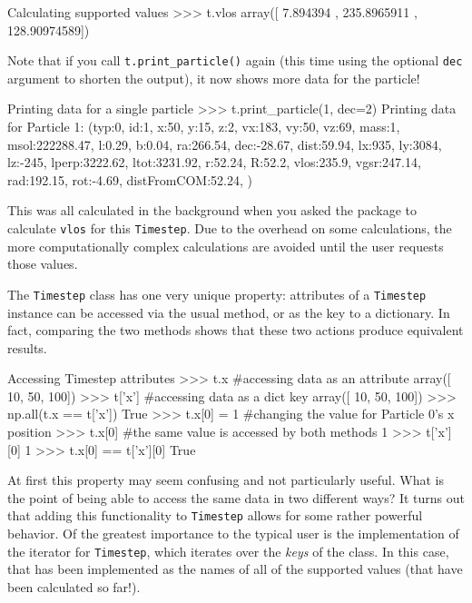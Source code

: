 \documentclass{article}
\begin{document}
\begin{codelisting}{Calculating supported values}
>>> t.vlos
array([  7.894394  , 235.8965911 , 128.90974589])
\end{codelisting}

Note that if you call \verb!t.print_particle()! again (this time using the optional \verb!dec! argument to shorten the output), it now shows more data for the particle! \\

\begin{codelisting}{Printing data for a single particle}
>>> t.print_particle(1, dec=2)
Printing data for Particle 1:
(typ:0, id:1, x:50, y:15, z:2, vx:183, vy:50, vz:69, mass:1, msol:222288.47, 
l:0.29, b:0.04, ra:266.54, dec:-28.67, dist:59.94, lx:935, ly:3084, 
lz:-245, lperp:3222.62, ltot:3231.92, r:52.24, R:52.2, vlos:235.9, 
vgsr:247.14, rad:192.15, rot:-4.69, distFromCOM:52.24, )
\end{codelisting}

This was all calculated in the background when you asked the package to calculate \verb!vlos! for this \verb!Timestep!. Due to the overhead on some calculations, the more computationally complex calculations are avoided until the user requests those values.

The \verb!Timestep! class has one very unique property: attributes of a \verb!Timestep! instance can be accessed via the usual method, or as the key to a dictionary. In fact, comparing the two methods shows that these two actions produce equivalent results. \\

\begin{codelisting}{Accessing Timestep attributes}
>>> t.x #accessing data as an attribute
array([ 10,  50, 100])
>>> t['x'] #accessing data as a dict key
array([ 10,  50, 100])
>>> np.all(t.x == t['x'])
True
>>> t.x[0] = 1 #changing the value for Particle 0's x position
>>> t.x[0] #the same value is accessed by both methods
1
>>> t['x'][0]
1
>>> t.x[0] == t['x'][0]
True
\end{codelisting}

At first this property may seem confusing and not particularly useful. What is the point of being able to access the same data in two different ways? It turns out that adding this functionality to \verb!Timestep! allows for some rather powerful behavior. Of the greatest importance to the typical user is the implementation of the iterator for \verb!Timestep!, which iterates over the \textit{keys} of the class. In this case, that has been implemented as the names of all of the supported values (that have been calculated so far!).\\
\end{document}
